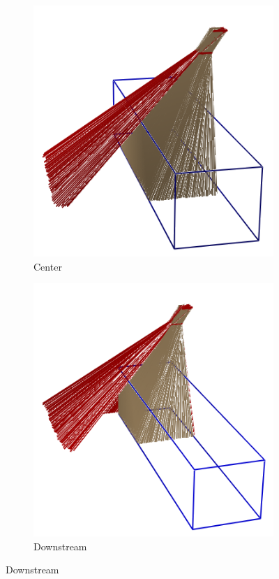 \documentclass[a4paper]{scrartcl}
\begin{document}
\begin{figure}[htbp]
\begin{subfigure}{0.30\textwidth}
    \includegraphics[width=\linewidth]{figures/center.png}
    \caption{Center} \label{fig:centre}
  \end{subfigure}
  \begin{subfigure}{0.30\textwidth}
    \includegraphics[width=\linewidth]{figures/downstream.png}
    \caption{Downstream} \label{fig:downstream}
  \end{subfigure}


\end{figure}
\end{document}
